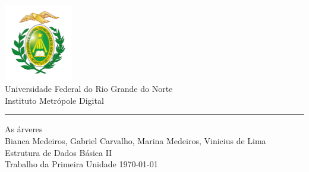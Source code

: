 \documentclass[a4paper,11pt,oneside]{book}
\begin{document}

\frontmatter

\begin{titlepage}
	\begin{center}
		\includegraphics[width=3cm]{figures/ufrnlogo.png}\\[0.5cm]
		{\LARGE Universidade Federal do Rio Grande do Norte\\[0.5cm]
		Instituto Metrópole Digital}\\[2cm]
		{\color{blue} \rule{\textwidth}{1pt}}
		\linespread{1.2}\huge {
			As árveres
		}
		\linespread{1}~\\[2cm]
		{\Large
		Bianca Medeiros,
		Gabriel Carvalho,
		Marina Medeiros,
		Vinicius de Lima
		}\\[1cm]

		{\large
		\emph{} Estrutura de Dados Básica II}\\[1cm] %

		\large Trabalho da Primeira Unidade
		\vfill
		\today
	\end{center}
\end{titlepage}


\tableofcontents

\mainmatter







\nocite{*}
\end{document}
